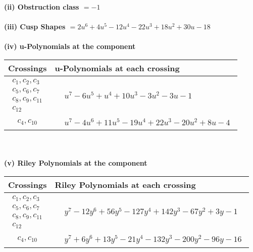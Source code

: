 \documentclass[1p]{elsarticle_modified}
\theoremstyle{definition}
\begin{document}
\flushleft \textbf{(ii) Obstruction class $= -1$}\\~\\
\flushleft \textbf{(iii) Cusp Shapes $= 2 u^6+4 u^5-12 u^4-22 u^3+18 u^2+30 u-18$}\\~\\
\newpage\renewcommand{\arraystretch}{1}
\flushleft \textbf{(iv) u-Polynomials at the component}\newline \\
\begin{tabular}{m{50pt}|m{274pt}}
Crossings & \hspace{64pt}u-Polynomials at each crossing \\
\hline $$\begin{aligned}c_{1},c_{2},c_{3}\\c_{5},c_{6},c_{7}\\c_{8},c_{9},c_{11}\\c_{12}\end{aligned}$$&$\begin{aligned}
&u^7-6 u^5+u^4+10 u^3-3 u^2-3 u-1
\end{aligned}$\\
\hline $$\begin{aligned}c_{4},c_{10}\end{aligned}$$&$\begin{aligned}
&u^7-4 u^6+11 u^5-19 u^4+22 u^3-20 u^2+8 u-4
\end{aligned}$\\
\hline
\end{tabular}\\~\\
\newpage\renewcommand{\arraystretch}{1}
\flushleft \textbf{(v) Riley Polynomials at the component}\newline \\
\begin{tabular}{m{50pt}|m{274pt}}
Crossings & \hspace{64pt}Riley Polynomials at each crossing \\
\hline $$\begin{aligned}c_{1},c_{2},c_{3}\\c_{5},c_{6},c_{7}\\c_{8},c_{9},c_{11}\\c_{12}\end{aligned}$$&$\begin{aligned}
&y^7-12 y^6+56 y^5-127 y^4+142 y^3-67 y^2+3 y-1
\end{aligned}$\\
\hline $$\begin{aligned}c_{4},c_{10}\end{aligned}$$&$\begin{aligned}
&y^7+6 y^6+13 y^5-21 y^4-132 y^3-200 y^2-96 y-16
\end{aligned}$\\
\hline
\end{tabular}\\~\\
\end{document}
